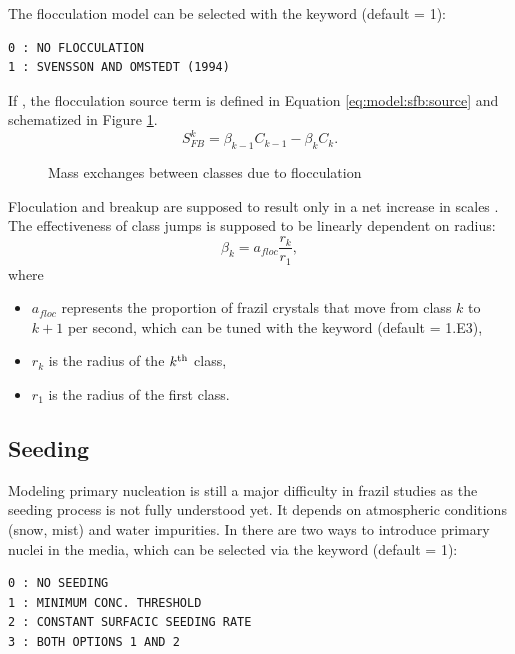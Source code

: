 The flocculation model can be selected with the keyword
 (default = 1):
\begin{lstlisting}
0 : NO FLOCCULATION
1 : SVENSSON AND OMSTEDT (1994)
\end{lstlisting}

If ,
the flocculation source term is defined in Equation \eqref{eq:model:sfb:source} and schematized in
Figure \ref{fig:flocculation}.
\begin{equation}
S_{FB}^{k}=\beta_{k-1}C_{k-1} -\beta _{k}C_{k}.
\label{eq:model:sfb:source}
\end{equation}

\begin{figure}[H]
    \begin{center}
    \end{center}
    \caption{Mass exchanges between classes due to flocculation}
    \label{fig:flocculation}
\end{figure}

Floculation and breakup are supposed to result only in a net increase in scales \cite{Omstedt_1994}.
The effectiveness of class jumps is
supposed to be linearly dependent on radius:
\begin{equation}
\beta_k = a_{floc} \dfrac{r_k}{r_1},
\label{eq:model:sfb:beta_k}
\end{equation}
where
\begin{itemize}
	\item $a_{floc}$ represents the proportion of frazil crystals that move from class $k$ to $k+1$ per second,
    which can be tuned with the keyword  (default = 1.E3),
    \item $r_k$ is the radius of the $k^{\rm{th}}$ class,
    \item $r_1$ is the radius of the first class.
\end{itemize}



\subsection{Seeding}
\label{section:seeding}

Modeling primary nucleation is still a major difficulty in frazil studies as the seeding process is
not fully understood yet. It depends on atmospheric conditions (snow, mist) and water impurities.
In \khione there are two ways to introduce primary nuclei in the media, which can be selected via the keyword
 (default = 1):
\begin{lstlisting}
0 : NO SEEDING
1 : MINIMUM CONC. THRESHOLD
2 : CONSTANT SURFACIC SEEDING RATE
3 : BOTH OPTIONS 1 AND 2
\end{lstlisting}


